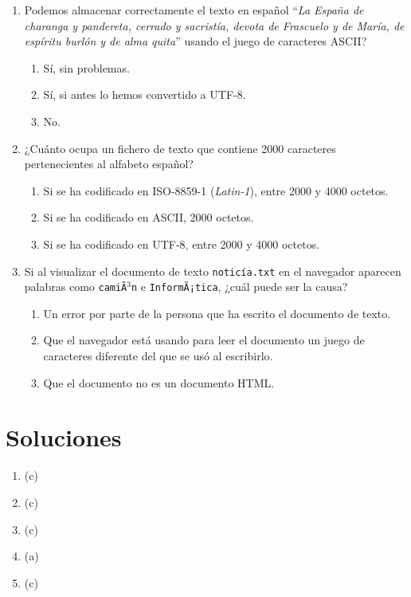 {\begin{enumerate}
\item Podemos almacenar correctamente el texto en español ``\emph{La España de charanga y pandereta, cerrado y sacristía, devota de Frascuelo y de María, de espíritu burlón y de alma quita}'' usando el juego de caracteres ASCII? \begin{enumerate} \item Sí, sin problemas. \item Sí, si antes lo hemos convertido a UTF-8. \item No. \end{enumerate} 

\item ¿Cuánto ocupa un fichero de texto que contiene 2000 caracteres pertenecientes al alfabeto español? \begin{enumerate} \item Si se ha codificado en ISO-8859-1 (\emph{Latin-1}), entre 2000 y 4000 octetos. \item Si se ha codificado en ASCII, 2000 octetos. \item Si se ha codificado en UTF-8, entre 2000 y 4000 octetos. \end{enumerate} 

\item Si al visualizar el documento de texto \texttt{noticía.txt} en el navegador  aparecen palabras como \texttt{camiÃ\(^3\)n} e \texttt{InformÃ¡tica}, ¿cuál  puede ser la causa? \begin{enumerate} \item Un error por parte de la persona que ha escrito el documento de texto. \item Que el navegador está usando para leer el documento un juego de caracteres diferente del que se usó al escribirlo. \item Que el documento no es un documento HTML. \end{enumerate} 

\end{enumerate} 

\section{Soluciones} \begin{enumerate} \item (c) \item (c) \item (c) \item (a) \item (c) 


\end{enumerate}}
